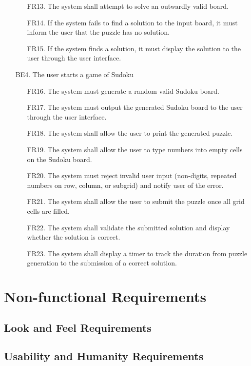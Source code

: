 \documentclass[11pt]{article}
\begin{document}
\begin{enumerate}
\begin{enumerate}
        \item [FR13.] The system shall attempt to solve an outwardly valid board.
        \item [FR14.] If the system fails to find a solution to the input board, it must inform the user that the puzzle has no solution.
        \item [FR15.] If the system finds a solution, it must display the solution to the user through the user interface.
    \end{enumerate}
    \item [BE4.] The user starts a game of Sudoku
    \begin{enumerate}
        \item [FR16.] The system must generate a random valid Sudoku board.
        \item [FR17.] The system must output the generated Sudoku board to the user through the user interface.
        \item [FR18.] The system shall allow the user to print the generated puzzle.
        \item [FR19.] The system shall allow the user to type numbers into empty cells on the Sudoku board.
        \item [FR20.] The system must reject invalid user input (non-digits, repeated numbers on row, column, or subgrid) and notify user of the error.
        \item [FR21.] The system shall allow the user to submit the puzzle once all grid cells are filled.
        \item [FR22.] The system shall validate the submitted solution and display whether the solution is correct.
        \item [FR23.] The system shall display a timer to track the duration from puzzle generation to the submission of a correct solution.
    \end{enumerate}
\end{enumerate}

\section{Non-functional Requirements}

\subsection{Look and Feel Requirements}

\subsection{Usability and Humanity Requirements}
\end{document}
